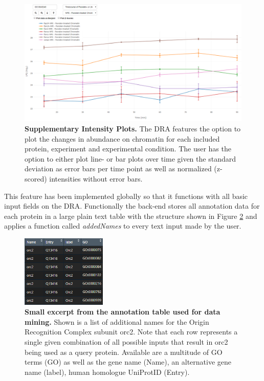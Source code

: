 \begin{figure}[H]
    \centering
    \includegraphics[width=\textwidth]{resources/images/Results/fanc_plottingPso.png}
    \caption[Supplementary Intensity Plots]{\textbf{Supplementary Intensity Plots. }The DRA features the option to plot the changes in abundance on chromatin for each included protein, experiment and experimental condition. The user has the option to either plot line- or bar plots over time given the standard deviation as error bars per time point as well as normalized (z-scored) intensities without error bars.}
    \label{fig:fanc_plotting}
\end{figure}
This feature has been implemented globally so that it functions with all basic input fields on the DRA. Functionally the back-end stores all annotation data for each protein in a large plain text table with the structure shown in Figure \ref{fig:annotation} and applies a function called \textit{addedNames} to every text input made by the user.
\newpage
\begin{figure}
    \includegraphics[width=0.36\textwidth]{resources/images/Results/annotation.PNG}
    \caption[Small excerpt from the annotation table used for data mining]{\textbf{Small excerpt from the annotation table used for data mining. }Shown is a list of additional names for the Origin Recognition Complex subunit orc2. Note that each row represents a single given combination of all possible inputs that result in orc2 being used as a query protein. Available are a multitude of GO terms (GO) as well as the gene name (Name), an alternative gene name (label), human homologue UniProtID (Entry).}
    \label{fig:annotation}
\end{figure}
